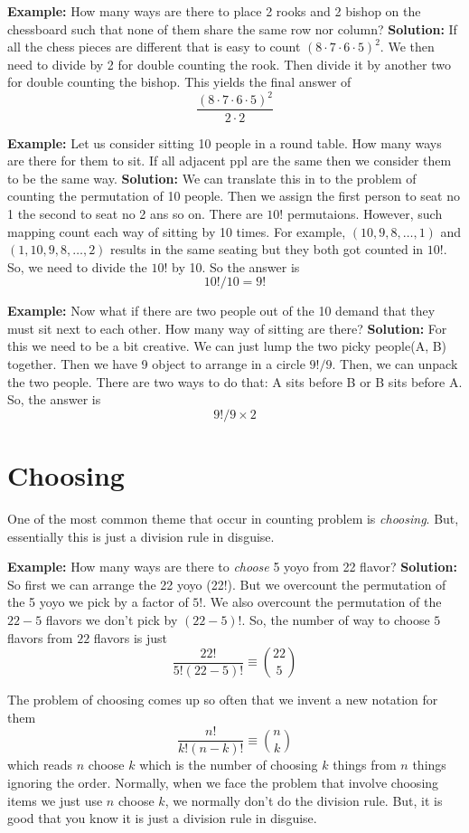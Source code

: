 \documentclass[a4paper, 12pt]{article}
\newcommand{\example}{\vspace{1em}\noindent\textbf{Example:} }
\newcommand{\solution}{\newline\noindent\textbf{Solution:} }
\begin{document}
\begin{multicols}{2}
	\example How many ways are there to place 2 rooks and 2 bishop on the chessboard such that none of them share the same row nor column?
		\solution If all the chess pieces are different that is easy to count $(8\cdot7\cdot6\cdot5)^2$. We then need to divide by 2 for double counting the rook. Then divide it by another two for double counting the bishop. This yields the final answer of
		\[
		\frac{(8\cdot7\cdot6\cdot5)^2}{2\cdot 2}
		\]
	
	\example Let us consider sitting 10 people in a round table. How many ways are there for them to sit. If all adjacent ppl are the same then we consider them to be the same way.
	\solution We can translate this in to the problem of counting the permutation of 10 people. Then we assign the first person to seat no 1 the second to seat no 2 ans so on. There are $10!$ permutaions. However, such mapping count each way of sitting by 10 times. For example, $(10,9,8,\ldots,1)$ and $(1,10,9,8,\ldots,2)$ results in the same seating but they both got counted in $10!$. So, we need to divide the $10!$ by 10. So the answer is
	\[
		10!/10 = 9!
	\]
	
	\example Now what if there are two people out of the 10 demand that they must sit next to each other. How many way of sitting are there?
	\solution For this we need to be a bit creative. We can just lump the two picky people(A, B) together. Then we have 9 object to arrange in a circle $9!/9$. Then, we can unpack the two people. There are two ways to do that: A sits before B or B sits before A. So, the answer is
	\[
		9!/9 \times 2
	\]
	
	\section*{Choosing}
	One of the most common theme that occur in counting problem is \emph{choosing}. But, essentially this is just a division rule in disguise.
	
	\example How many ways are there to \emph{choose} 5 yoyo from 22 flavor?
	\solution So first we can arrange the 22 yoyo (22!). But we overcount the permutation of the 5 yoyo we pick by a factor of $5!$. We also overcount the permutation of the $22-5$ flavors we don't pick by $(22-5)!$. So, the number of way to choose $5$ flavors from $22$ flavors is just
	\[
		\frac{22!}{5!(22-5)!} \equiv {22 \choose 5} 
	\]
	
	The problem of choosing comes up so often that we invent a new notation for them
	\[
		\frac{n!}{k! (n-k)!} \equiv {n \choose k}
	\]
	which reads $n$ choose $k$ which is the number of choosing $k$ things from $n$ things ignoring the order. Normally, when we face the problem that involve choosing items we just use $n$ choose $k$, we normally don't do the division rule. But, it is good that you know it is just a division rule in disguise.
	

\end{multicols}
\end{document}
